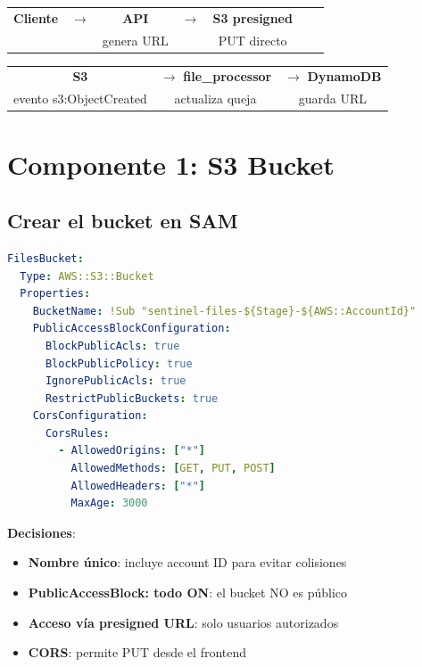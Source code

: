 \documentclass[11pt,a4paper,oneside]{article}
\newcommand{\ok}{\textcolor{okgreen}{\textbf{\checkmark}}}
\begin{document}
\begin{center}
\begin{tabular}{ccccccc}
\textbf{Cliente} & $\rightarrow$ & \textbf{API} & $\rightarrow$ & \textbf{S3 presigned} \\
& & genera URL & & PUT directo \\
\end{tabular}
\end{center}

\begin{center}
\begin{tabular}{ccc}
\textbf{S3} & $\rightarrow$ \textbf{file\_processor} & $\rightarrow$ \textbf{DynamoDB} \\
evento s3:ObjectCreated & actualiza queja & guarda URL \\
\end{tabular}
\end{center}

\section{Componente 1: S3 Bucket}

\subsection{Crear el bucket en SAM}

\begin{lstlisting}[language=yaml,caption={infra/template.yaml — S3 bucket}]
FilesBucket:
  Type: AWS::S3::Bucket
  Properties:
    BucketName: !Sub "sentinel-files-${Stage}-${AWS::AccountId}"
    PublicAccessBlockConfiguration:
      BlockPublicAcls: true
      BlockPublicPolicy: true
      IgnorePublicAcls: true
      RestrictPublicBuckets: true
    CorsConfiguration:
      CorsRules:
        - AllowedOrigins: ["*"]
          AllowedMethods: [GET, PUT, POST]
          AllowedHeaders: ["*"]
          MaxAge: 3000
\end{lstlisting}

\textbf{Decisiones}:
\begin{itemize}
  \item \ok \textbf{Nombre \'unico}: incluye account ID para evitar colisiones
  \item \ok \textbf{PublicAccessBlock: todo ON}: el bucket NO es p\'ublico
  \item \ok \textbf{Acceso v\'ia presigned URL}: solo usuarios autorizados
  \item \ok \textbf{CORS}: permite PUT desde el frontend
\end{itemize}
\end{document}
